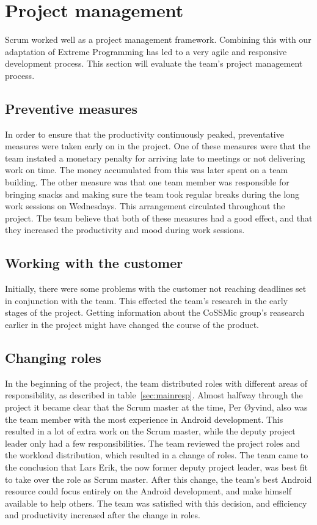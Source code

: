 \newpage
\section{Project management}
Scrum worked well as a project management framework. Combining this with our adaptation of Extreme Programming has led to a very agile and responsive development process. This section will evaluate the team's project management process.

\subsection{Preventive measures}
In order to ensure that the productivity continuously peaked, preventative measures were taken early on in the project. One of these measures were that the team instated a monetary penalty for arriving late to meetings or not delivering work on time. The money accumulated from this was later spent on a team building. The other measure was that one team member was responsible for bringing snacks and making sure the team took regular breaks during the long work sessions on Wednesdays. This arrangement circulated throughout the project. The team believe that both of these measures had a good effect, and that they increased the productivity and mood during work sessions.

\subsection{Working with the customer}
 Initially, there were some problems with the customer not reaching deadlines set in conjunction with the team. This effected the team's research in the early stages of the project. Getting information about the CoSSMic group's reasearch earlier in the project might have changed the course of the product. 

\subsection{Changing roles}
\label{sec:unbalancedWorkload}
In the beginning of the project, the team distributed roles with different areas of responsibility, as described in table~\ref{sec:mainresp}. Almost halfway through the project it became clear that the Scrum master at the time, Per Øyvind, also was the team member with the most experience in Android development. This resulted in a lot of extra work on the Scrum master, while the deputy project leader only had a few responsibilities. The team reviewed the project roles and the workload distribution, which resulted in a change of roles. The team came to the conclusion that Lars Erik, the now former deputy project leader, was best fit to take over the role as Scrum master. After this change, the team's best Android resource could focus entirely on the Android development, and make himself available to help others. The team was satisfied with this decision, and efficiency and productivity increased after the change in roles.

